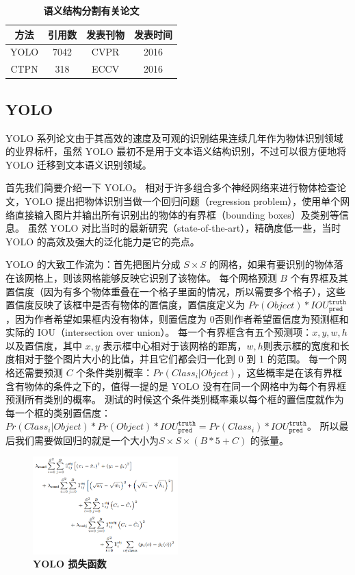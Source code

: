 \begin{table}[!hpt]
	\caption[]{\textbf{语义结构分割有关论文}}
	\label{tab:preprocessing_papers}
	\centering
	\begin{tabular}{c c c c}
		\hline
		方法 & 引用数 & 发表刊物 & 发表时间 \\ [0.5ex] 
		\hline
		YOLO & 7042 & CVPR & 2016 \\
		CTPN & 318 & ECCV & 2016 \\
		\hline
	\end{tabular}
\end{table}

\subsection{YOLO}
YOLO 系列论文由于其高效的速度及可观的识别结果连续几年作为物体识别领域的业界标杆，虽然 YOLO 最初不是用于文本语义结构识别，不过可以很方便地将 YOLO 迁移到文本语义识别领域。

首先我们简要介绍一下 YOLO\cite{YOLO}。
相对于许多组合多个神经网络来进行物体检查论文，YOLO 提出把物体识别当做一个回归问题（regression problem），使用单个网络直接输入图片并输出所有识别出的物体的有界框（bounding boxes）及类别等信息。
虽然 YOLO 对比当时的最新研究（state-of-the-art），精确度低一些，当时 YOLO 的高效及强大的泛化能力是它的亮点。

YOLO 的大致工作流为：首先把图片分成 $S \times S$ 的网格，如果有要识别的物体落在该网格上，则该网格能够反映它识别了该物体。
每个网格预测 $B$ 个有界框及其置信度（因为有多个物体重叠在一个格子里面的情况，所以需要多个格子），这些置信度反映了该框中是否有物体的置信度，置信度定义为 $Pr(Object)*IOU^{\texttt{truth}}_{\texttt{pred}}$，因为作者希望如果框内没有物体，则置信度为 $0$否则作者希望置信度为预测框和实际的 IOU（intersection over union）。
每一个有界框含有五个预测项：$x,y,w,h$ 以及置信度，其中 $x,y$ 表示框中心相对于该网格的距离，$w,h$则表示框的宽度和长度相对于整个图片大小的比值，并且它们都会归一化到 0 到 1 的范围。
每一个网格还需要预测 $C$ 个条件类别概率：$Pr(Class_i|Object)$，这些概率是在该有界框含有物体的条件之下的，值得一提的是 YOLO 没有在同一个网格中为每个有界框预测所有类别的概率。
测试的时候这个条件类别概率乘以每个框的置信度就作为每一个框的类别置信度：$Pr(Class_i|Object)*Pr(Object)*IOU^{\texttt{truth}}_{\texttt{pred}} = Pr(Class_i)*IOU^{\texttt{truth}}_{\texttt{pred}}$。
所以最后我们需要做回归的就是一个大小为$S \times S \times (B * 5 + C)$ 的张量。

\begin{figure}[h!]
	\centering
	\includegraphics[width=0.5\textwidth]{figure/resources/YOLO_loss.png}
	\caption{\textbf{YOLO 损失函数}\label{YOLO_loss}}
\end{figure}

